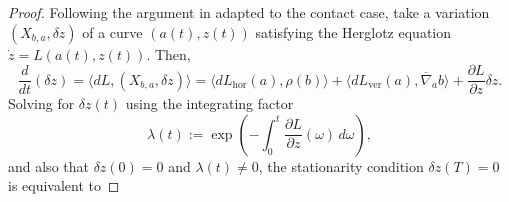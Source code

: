 \documentclass[11pt,a4paper]{article}
\theoremstyle{definition}
\begin{document}
\begin{proof}


Following the argument in
\cite{li2017lagrangian,hu2024hamiltonian} adapted to the contact case, take a variation $(X_{b,a}, \delta z)$ of a curve $(a(t), z(t))$ satisfying the Herglotz equation $\dot{z}=L(a(t),z(t))$. Then,
$$\frac{d}{dt}(\delta z)= \langle d L, (X_{b,a}, \delta z) \rangle = \langle dL_{\mathrm{hor}}(a), \rho(b) \rangle + \langle dL_{\mathrm{ver}}(a), \overline{\nabla}_{a} b \rangle + \frac{\partial L}{\partial z}\delta z.$$
Solving for $\delta z(t)$ using the integrating factor
\[
\lambda(t) := \exp\!\left(-\int_0^t \frac{\partial L}{\partial z}(\omega)\,d\omega\right),
\]
and also that $\delta z(0)=0$ and $\lambda(t)\neq 0$, the stationarity condition $\delta z(T)=0$ is equivalent to


\end{proof}
\end{document}
